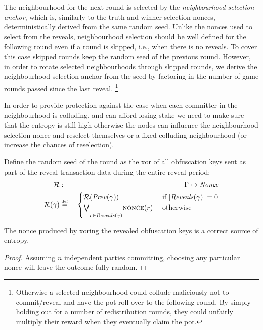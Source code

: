 The neighbourhood for the next round is selected by the \emph{neighbourhood selection anchor}, which is, similarly to the truth and winner selection nonces, deterministically derived from the same random seed. Unlike the nonces used to select from the reveals, neighbourhood selection should be well defined for the following round even if a round is skipped, i.e., when there is no reveals. To cover this case skipped rounds keep the random seed of the previous round. However, in order to rotate selected neighbourhoods through skipped rounds, we derive the neighbourhood selection anchor from the seed by factoring in the  number of game rounds passed since the last reveal.%
%
\footnote{Otherwise a selected neighbourhood could collude maliciously not to commit/reveal and have the pot roll over to the following round. By simply holding out for a number of redistribution rounds, they could unfairly multiply their reward when they eventually claim the pot.}
%



In order to provide protection against the case when each committer in the neighbourhood is colluding, and can afford losing stake we need to make sure that the entropy is still high otherwise the nodes can influence the neighbourhood selection nonce and reselect themselves or a fixed colluding neighbourhood (or increase the chances of reselection).%
%


\begin{definition}
\label{def:random-seed}
%
Define the random seed of the round as the xor of all obfuscation keys sent as part of the reveal transaction data during the entire reveal period:
%
\begin{eqnarray}
\mathcal{R}&:&\Gamma\mapsto\mathit{Nonce}\\
\mathcal{R}(\gamma)&\defeq\ &\begin{cases}\mathcal{R}(\mathit{Prev}(\gamma))  &\text{ if }  \lvert\mathit{Reveals}(\gamma)\rvert=0\\
\Xor_{r\in\mathit{Reveals}(\gamma)}\textsc{nonce}(r) &\text{ otherwise }
\end{cases}
\end{eqnarray}
\end{definition}

\begin{lemma}
The nonce produced by xoring the revealed obfuscation keys is a correct source of entropy.
%
\begin{proof}
Assuming $n$ independent parties committing, choosing any particular nonce will leave the outcome fully random.
\end{proof}
\end{lemma}     
